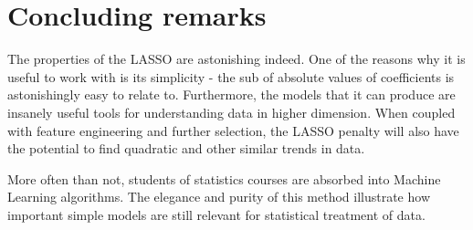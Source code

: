 \documentclass[%
 reprint,
 amsmath,amssymb,
 aps,
]{revtex4-1}
\begin{document}
\section{Concluding remarks}
The properties of the LASSO are astonishing indeed.
One of the reasons why it is useful to work with is its simplicity - the sub of absolute values of coefficients is astonishingly easy to relate to.
Furthermore, the models that it can produce are insanely useful tools for understanding data in higher dimension.
When coupled with feature engineering and further selection, the LASSO penalty will also have the potential to find quadratic and other similar trends in data.

More often than not, students of statistics courses are absorbed into Machine Learning algorithms.
The elegance and purity of this method illustrate how important simple models are still relevant for statistical treatment of data.
\newpage


\end{document}
